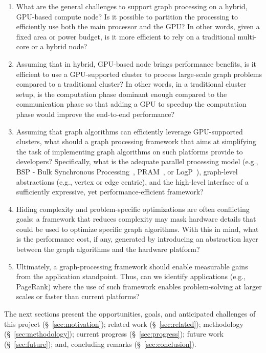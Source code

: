 \begin{enumerate}
\item What are the general challenges to support graph processing on a hybrid, GPU-based compute node? Is it possible to partition the processing to efficiently use both the main processor and the GPU? In other words, given a fixed area or power budget, is it more efficient to rely on a traditional multi-core or a hybrid node?

\item Assuming that in hybrid, GPU-based node brings performance benefits, is it efficient to use a GPU-supported cluster to process large-scale graph problems compared to a traditional cluster? In other words, in a traditional cluster setup, is the computation phase dominant enough compared to the communication phase so that adding a GPU to speedup the computation phase would improve the end-to-end performance?

\item Assuming that graph algorithms can efficiently leverage GPU-supported clusters, what should a graph processing framework that aims at simplifying the task of implementing graph algorithms on such platforms provide to developers? Specifically, what is the adequate parallel processing model (e.g., BSP - Bulk Synchronous Processing~\cite{Valiant1990}, PRAM~\cite{Fortune78}, or LogP~\cite{Culler1996}), graph-level abstractions (e.g., vertex or edge centric), and the high-level interface of a sufficiently expressive, yet performance-efficient framework?

\item Hiding complexity and problem-specific optimizations are often conflicting goals: a framework that reduces complexity may mask hardware details that could be used to optimize specific graph algorithms. With this in mind, what is the performance cost, if any, generated by introducing an abstraction layer between the graph algorithms and the hardware platform?

\item Ultimately, a graph-processing framework should enable measurable gains from the application standpoint. Thus, can we identify applications (e.g., PageRank) where the use of such framework enables problem-solving at larger scales or faster than current platforms?

\end{enumerate}

The next sections present the opportunities, goals, and anticipated challenges of this project (\S~\ref{sec:motivation}); related work (\S~\ref{sec:related}); methodology (\S~\ref{sec:methodology}); current progress (\S~\ref{sec:progress}); future work (\S~\ref{sec:future}); and, concluding remarks (\S ~\ref{sec:conclusion}).
